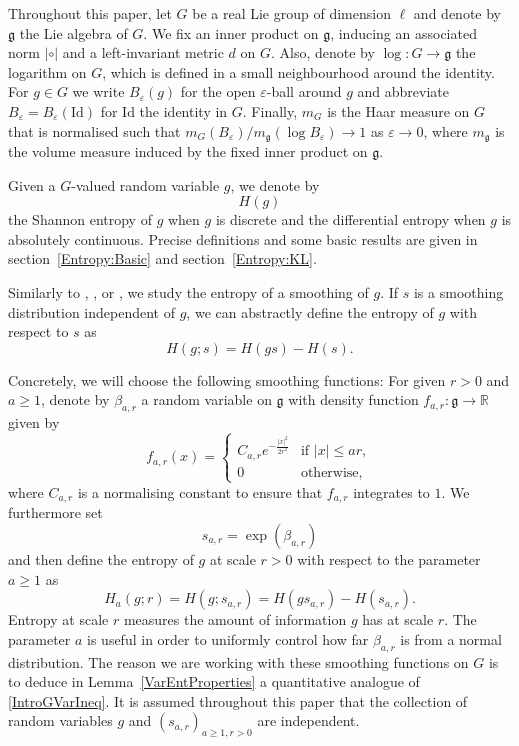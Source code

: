 \documentclass[10pt, english,oneside,reqno]{amsart}
\theoremstyle{plain}
\theoremstyle{remark}
\numberwithin{equation}{section}
\numberwithin{figure}{section}
\newcommand{\eps}{\varepsilon}
\newcommand{\R}{\mathbb{R}}
\newcommand{\Haarof}[1]{m_{#1}}
\begin{document}
    Throughout this paper, let $G$ be a real Lie group of dimension $\ell$ and denote by $\mathfrak{g}$ the Lie algebra of $G$. We fix an inner product on $\mathfrak{g}$, inducing an associated norm $|\circ|$ and a left-invariant metric $d$ on $G$. Also, denote by $\log: G \to \mathfrak{g}$ the logarithm on $G$, which is defined in a small neighbourhood around the identity. For $g \in G$ we write $B_{\eps}(g)$ for the open $\eps$-ball around $g$ and abbreviate $B_{\eps} =  B_{\eps}(\mathrm{Id})$ for $\mathrm{Id}$ the identity in $G$.  Finally, $\Haarof{G}$ is the Haar measure on $G$ that is normalised such that $\Haarof{G}(B_{\eps}) / \Haarof{\mathfrak{g}}(\log B_{\eps}) \to 1$ as $\eps \to 0$, where $\Haarof{\mathfrak{g}}$ is the volume measure induced by the fixed inner product on $\mathfrak{g}$.  

    
    
    Given a $G$-valued random variable $g$, we denote by $$H(g)$$ the Shannon entropy of $g$ when $g$ is discrete and the differential entropy when $g$ is absolutely continuous. Precise definitions and some basic results are given in section~\ref{Entropy:Basic} and section~\ref{Entropy:KL}.

    Similarly to \cite{Hochman2014}, \cite{Hochman2017}, \cite{BaranyHochmanRapaport2019} or \cite{Varju2019}, we study the entropy of a smoothing of $g$. If $s$ is a smoothing distribution independent of $g$, we can abstractly define the entropy of $g$ with respect to $s$ as $$H(g; s) = H(gs) - H(s).$$ 

    Concretely, we will choose the following smoothing functions: For given $r > 0$ and $a \geq 1$, denote by $\beta_{a,r}$ a random variable on $\mathfrak{g}$ with density function $f_{a,r}: \mathfrak{g} \to \R$ given by $$f_{a,r}(x) = \begin{cases}
    C_{a,r}e^{-\frac{|x|^2}{2r^2}} & \text{if } |x| \leq ar, \\
    0 &\text{otherwise},
    \end{cases}$$ where $C_{a,r}$ is a normalising constant to ensure that $f_{a,r}$ integrates to $1$. We furthermore set 
    \begin{equation}\label{sardef}
        s_{a,r} = \exp(\beta_{a,r})
    \end{equation}
    and then define the entropy of $g$ at scale $r > 0$ with respect to the parameter $a \geq 1$ as 
    \begin{equation}\label{Hadef}
        H_a(g;r) = H(g; s_{a,r}) = H(gs_{a,r}) - H(s_{a,r}).
    \end{equation}
    Entropy at scale $r$ measures the amount of information $g$ has at scale $r$. The parameter $a$ is useful in order to uniformly control how far $\beta_{a,r}$ is from a normal distribution. The reason we are working with these smoothing functions on $G$ is to deduce in 
    Lemma~\ref{VarEntProperties} a quantitative analogue of \eqref{IntroGVarIneq}. It is assumed throughout this paper that the collection of random variables $g$ and $(s_{a,r})_{a \geq 1, r > 0}$ are independent. 
\end{document}
